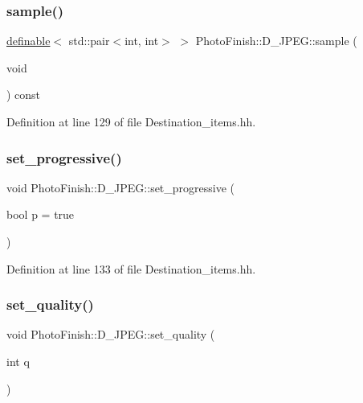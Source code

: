 \subsubsection{\texorpdfstring{sample()}{sample()}}
{\footnotesize\ttfamily \hyperlink{class_photo_finish_1_1definable}{definable}$<$ std\+::pair$<$int, int$>$ $>$ Photo\+Finish\+::\+D\+\_\+\+J\+P\+E\+G\+::sample (\begin{DoxyParamCaption}\item[{void}]{ }\end{DoxyParamCaption}) const\hspace{0.3cm}{\ttfamily [inline]}}



Definition at line 129 of file Destination\+\_\+items.\+hh.

\mbox{\label{class_photo_finish_1_1_d___j_p_e_g_a75bdf3b848842df7e56d0e7cd7bf6c16}} 
\subsubsection{\texorpdfstring{set\+\_\+progressive()}{set\_progressive()}}
{\footnotesize\ttfamily void Photo\+Finish\+::\+D\+\_\+\+J\+P\+E\+G\+::set\+\_\+progressive (\begin{DoxyParamCaption}\item[{bool}]{p = {\ttfamily true} }\end{DoxyParamCaption})\hspace{0.3cm}{\ttfamily [inline]}}



Definition at line 133 of file Destination\+\_\+items.\+hh.

\mbox{\label{class_photo_finish_1_1_d___j_p_e_g_a4312123742612b8793b8b05e7d4c4da9}} 
\subsubsection{\texorpdfstring{set\+\_\+quality()}{set\_quality()}}
{\footnotesize\ttfamily void Photo\+Finish\+::\+D\+\_\+\+J\+P\+E\+G\+::set\+\_\+quality (\begin{DoxyParamCaption}\item[{int}]{q }\end{DoxyParamCaption})\hspace{0.3cm}{\ttfamily [inline]}}



